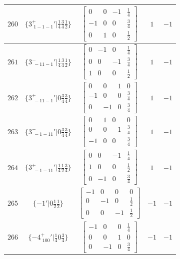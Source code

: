 \documentclass[fleqn,8pt]{jsarticle}
\begin{document}
\begin{longtable}{ccccc}
$ 260 $ & $ \{3^{+}_{\,\,1-1-1}{}'|\frac{1}{4} \frac{3}{4} \frac{1}{2}\} $ & $ \begin{bmatrix} 0 & 0 & -1 & \frac{1}{4} \\ -1 & 0 & 0 & \frac{3}{4} \\ 0 & 1 & 0 & \frac{1}{2} \end{bmatrix} $ & $ 1 $ & $ -1 $ \\ \hline
$ 261 $ & $ \{3^{-}_{\,\,-11-1}{}'|\frac{1}{4} \frac{3}{4} \frac{1}{2}\} $ & $ \begin{bmatrix} 0 & -1 & 0 & \frac{1}{4} \\ 0 & 0 & -1 & \frac{3}{4} \\ 1 & 0 & 0 & \frac{1}{2} \end{bmatrix} $ & $ 1 $ & $ -1 $ \\ \hline
$ 262 $ & $ \{3^{+}_{\,\,-11-1}{}'|0 \frac{3}{4} \frac{3}{4}\} $ & $ \begin{bmatrix} 0 & 0 & 1 & 0 \\ -1 & 0 & 0 & \frac{3}{4} \\ 0 & -1 & 0 & \frac{3}{4} \end{bmatrix} $ & $ 1 $ & $ -1 $ \\ \hline
$ 263 $ & $ \{3^{-}_{\,\,-1-11}{}'|0 \frac{3}{4} \frac{3}{4}\} $ & $ \begin{bmatrix} 0 & 1 & 0 & 0 \\ 0 & 0 & -1 & \frac{3}{4} \\ -1 & 0 & 0 & \frac{3}{4} \end{bmatrix} $ & $ 1 $ & $ -1 $ \\ \hline
$ 264 $ & $ \{3^{+}_{\,\,-1-11}{}'|\frac{1}{4} \frac{1}{2} \frac{3}{4}\} $ & $ \begin{bmatrix} 0 & 0 & -1 & \frac{1}{4} \\ 1 & 0 & 0 & \frac{1}{2} \\ 0 & -1 & 0 & \frac{3}{4} \end{bmatrix} $ & $ 1 $ & $ -1 $ \\ \hline
$ 265 $ & $ \{-1{}'|0 \frac{1}{2} \frac{1}{2}\} $ & $ \begin{bmatrix} -1 & 0 & 0 & 0 \\ 0 & -1 & 0 & \frac{1}{2} \\ 0 & 0 & -1 & \frac{1}{2} \end{bmatrix} $ & $ -1 $ & $ -1 $ \\ \hline
$ 266 $ & $ \{-4^{+}_{\,\,100}{}'|\frac{1}{4} 0 \frac{3}{4}\} $ & $ \begin{bmatrix} -1 & 0 & 0 & \frac{1}{4} \\ 0 & 0 & 1 & 0 \\ 0 & -1 & 0 & \frac{3}{4} \end{bmatrix} $ & $ -1 $ & $ -1 $ \\ \hline

\end{longtable}
\end{document}
